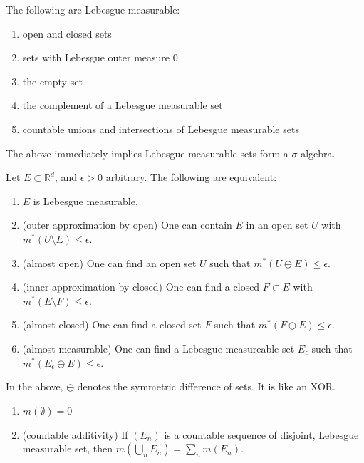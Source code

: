 \documentclass[12pt]{article}
\begin{document}
\begin{proposition} The following are Lebesgue measurable: \hfill
	\begin{enumerate}
		\item open and closed sets 
		\item sets with Lebesgue outer measure 0
		\item the empty set
		\item the complement of a Lebesgue measurable set
		\item countable unions and intersections of Lebesgue measurable sets
	\end{enumerate}
\end{proposition}

The above immediately implies Lebesgue measurable sets form a $\sigma$-algebra.

\begin{proposition} Let $E\subset\mathbb{R}^d$, and $\epsilon>0$ arbitrary. The following are equivalent: \hfill
	\begin{enumerate}
		\item $E$ is Lebesgue measurable.
		\item (outer approximation by open) One can contain $E$ in an open set $U$ with $m^\ast(U\setminus E)\leq \epsilon$.
		\item (almost open) One can find an open set $U$ such that $m^\ast(U\ominus E)\leq \epsilon$.
		\item (inner approximation by closed) One can find a closed $F\subset E$ with $m^\ast(E\setminus F)\leq \epsilon$.
		\item (almost closed) One can find a closed set $F$ such that $m^\ast(F\ominus E)\leq \epsilon$.
		\item (almost measurable) One can find a Lebesgue measureable set $E_\epsilon$ such that $m^\ast(E_\epsilon\ominus E)\leq \epsilon$.
	\end{enumerate}
\end{proposition}

In the above, $\ominus$ denotes the symmetric difference of sets. It is like an XOR.

\begin{proposition} \hfill
	\begin{enumerate}
		\item $m(\emptyset)=0$
		\item (countable additivity) If $(E_n)$ is a countable sequence of disjoint, Lebesgue measurable set, then $m(\bigcup_n E_n)=\sum_n m(E_n)$. 
	\end{enumerate}
\end{proposition}
\end{document}
